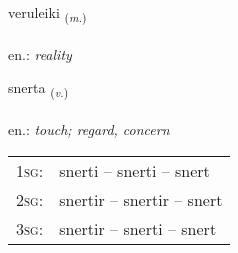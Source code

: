 \documentclass[frontgrid, backgrid]{flacards}\usepackage[]{graphicx}\usepackage[]{xcolor}
\begin{document}
\renewcommand{\blhead}{\vskip5pt {\small\bfseries\footnotesize Nafnorð | Noun }}
\renewcommand{\bcfoot}{\vskip5pt \hspace{2pt}{\small\bfseries\footnotesize 2K}}


{veruleiki \small{\textsubscript{(\textit{m.})}} \\[1ex] %
\textphonetic{[vɛːrʏleicɪ]} \\
en.: \emph{reality} \\  [2ex]
\renewcommand*{\arraystretch}{0.8}
}

\renewcommand{\flhead}{\vskip5pt \fboxsep=0pt {\small\bfseries\footnotesize Sagnorð | Verb}}
\renewcommand{\fcfoot}{\vskip5pt \fboxsep=0pt \hspace{2pt}{\small\bfseries\footnotesize 2K}}

\renewcommand{\blhead}{\vskip5pt {\small\bfseries\footnotesize Sagnorð | Verb }}
\renewcommand{\bcfoot}{\vskip5pt \hspace{2pt}{\small\bfseries\footnotesize 2K}}


{snerta \small{\textsubscript{(\textit{v.})}} \\[1ex] %
\textphonetic{[stnɛr̥ta]} \\
en.: \emph{touch; regard, concern} \\  [2ex]
\renewcommand*{\arraystretch}{0.8}
\begin{tabular}{p{1cm}l}
\textsc{1sg}: & snerti -- snerti -- snert \\ 
\textsc{2sg}: & snertir -- snertir -- snert \\ 
\textsc{3sg}: & snertir -- snerti -- snert \\ 
\end{tabular}
}
\end{document}
